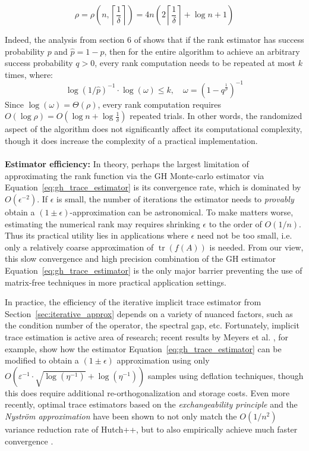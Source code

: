 \documentclass[pdflatex,sn-mathphys-num]{sn-jnl}
\begin{document}
\[\rho = \rho(n,\left\lceil \frac{1}{\delta} \right\rceil) = 4n\left. \left( 2\left\lceil \frac{1}{\delta} \right\rceil + \log n + 1 \right) \right.\]

\noindent Indeed, the analysis from section 6 of \cite{chen2011output} shows that if the rank estimator has success probability \(p\) and \(\hat{p} = 1 - p\), then for the entire algorithm to achieve an arbitrary success probability \(q > 0\), every rank computation needs to be repeated at most \(k\) times, where:
\[
{\log(1/\hat{p})}^{- 1} \cdot \log(\omega) \leq k,\quad\omega = \left( 1 - q^{\frac{1}{\rho}} \right)^{- 1}
\]
\noindent Since \(\log(\omega) = \Theta(\rho)\), every rank computation requires \(O\left( \log\rho \right) = O\left( \log n + \log\frac{1}{\delta} \right)\) repeated trials. In other words, the randomized aspect of the algorithm does not significantly affect its computational complexity, though it does increase the complexity of a practical implementation.
\\
\\
\textbf{Estimator efficiency:} In theory, perhaps the largest limitation of approximating the rank function via the GH Monte-carlo estimator via Equation~\ref{eq:gh_trace_estimator} is its convergence rate, which is dominated by \(O\left( \epsilon^{- 2} \right)\). If \(\epsilon\) is small, the number of iterations the estimator needs to \emph{provably} obtain a \((1 \pm \epsilon)\)-approximation can be astronomical. To make matters worse, estimating the numerical rank may requires shrinking \(\epsilon\) to the order of \(O(1/n)\). Thus its practical utility lies in applications where \(\epsilon\) need not be too small, i.e. only a relatively coarse approximation of \(\operatorname{tr}\left( f(A) \right)\) is needed. From our view, this slow convergence and high precision combination of the GH estimator Equation~\ref{eq:gh_trace_estimator} is the only major barrier preventing the use of matrix-free techniques in more practical application settings.

In practice, the efficiency of the iterative implicit trace estimator from Section~\ref{sec:iterative_approx} depends on a variety of nuanced factors, such as the condition number of the operator, the spectral gap, etc. Fortunately, implicit trace estimation is active area of research; recent results by Meyers et al. \cite{meyer2021hutchpp}, for example, show how the estimator Equation~\ref{eq:gh_trace_estimator} can be modified to obtain a \(\left. (1 \pm \epsilon) \right.\) approximation using only \(O\left( \varepsilon^{- 1} \cdot \sqrt{\log\left( \eta^{- 1} \right)} + \log\left( \eta^{- 1} \right) \right)\) samples using deflation techniques, though this does require additional re-orthogonalization and storage costs. Even more recently, optimal trace estimators based on the \emph{exchangeability principle} and the \emph{Nyström approximation} have been shown to not only match the \(O\left( 1/n^{2} \right)\) variance reduction rate of Hutch++, but to also empirically achieve much faster convergence \cite{epperly2024xtrace}.
\end{document}
